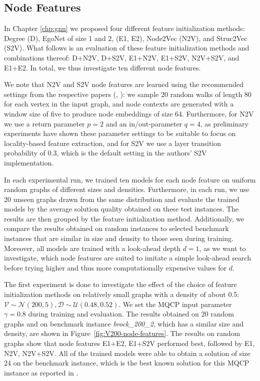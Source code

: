 \documentclass[draft,final]{vutinfth} %
\begin{document}
\subsection{Node Features}\label{subsec:node-features}
In Chapter \ref{chp:gnn} we proposed four different feature initialization methods: Degree (D), EgoNet of size 1 and 2, (E1, E2), Node2Vec (N2V), and Struc2Vec (S2V). What follows is an evaluation of these feature initialization methods and combinations thereof: D+N2V, D+S2V, E1+N2V, E1+S2V, N2V+S2V, and E1+E2. In total, we thus investigate ten different node features. 

We note that N2V and S2V node features are learned using the recommended settings from the respective papers (\cite{GroverL16}, \cite{FigueiredoRS17}): we sample 20 random walks of length 80 for each vertex in the input graph, and node contexts are generated with a window size of five to produce node embeddings of size 64. Furthermore, for N2V we use a return parameter $p=2$ and an in/out-parameter $q=4$, as preliminary experiments have shown these parameter settings to be suitable to focus on locality-based feature extraction, and for S2V we use a layer transition probability of $0.3$, which is the default setting in the authors' S2V implementation. 

In each experimental run, we trained ten models for each node feature on uniform random graphs of different sizes and densities. 
Furthermore, in each run, we use 20 unseen graphs drawn from the same distribution and evaluate the trained models by the average solution quality obtained on these test instances. The results are then grouped by the feature initialization method. Additionally, we compare the results obtained on random instances to selected benchmark instances that are similar in size and density to those seen during training. 
Moreover, all models are trained with a look-ahead depth $d=1$, as we want to investigate, which node features are suited to imitate a simple look-ahead search before trying higher and thus more computationally expensive values for $d$. 

The first experiment is done to investigate the effect of the choice of feature initialization methods on relatively small graphs with a density of about 0.5: $\mathcal{V} \sim \mathcal{N}(200, 5), \mathcal{D} \sim \mathcal{U}(0.48, 0.52)$. We set the MQCP input parameter $\gamma=0.8$ during training and evaluation. 
The results obtained on 20 random graphs and on benchmark instance \emph{brock\_200\_2}, which has a similar size and density, are shown in Figure~\ref{fig:V200-node-features}. 
The results on random graphs show that node features E1+E2, E1+S2V performed best, followed by E1, N2V, N2V+S2V. 
All of the trained models were able to obtain a solution of size 24 on the benchmark instance, which is the best known solution for this MQCP instance as reported in \cite{peng_solving_2021}. 
\end{document}
